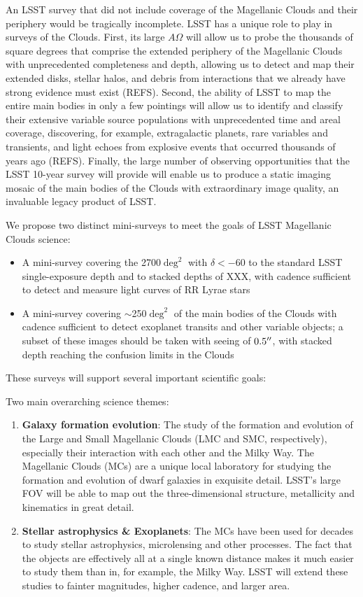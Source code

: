 An LSST survey that did not include coverage of the Magellanic Clouds and their periphery would be tragically incomplete.  LSST has a unique role to play in surveys of the Clouds.  First, its large $A\Omega$ will allow us to probe the thousands of square degrees that comprise the extended periphery of the Magellanic Clouds with unprecedented completeness and depth, allowing us to detect and map their extended disks, stellar halos, and debris from interactions that we already have strong evidence must exist (REFS).  Second, the ability of LSST to map the entire main bodies in only a few pointings will allow us to identify and classify their extensive variable source populations with unprecedented time and areal coverage, discovering, for example, extragalactic planets, rare variables and transients, and light echoes from explosive events that occurred thousands of years ago (REFS).  Finally, the large number of observing opportunities that the LSST 10-year survey will provide will enable us to produce a static imaging mosaic of the main bodies of the Clouds with extraordinary image quality, an invaluable legacy product of LSST.

We propose two distinct mini-surveys to meet the goals of LSST Magellanic Clouds science:
\begin{itemize}
\item A mini-survey covering the 2700$\deg^2$ with $\delta < -60$ to the standard LSST single-exposure depth and to stacked depths of XXX, with cadence sufficient to detect and measure light curves of RR Lyrae stars 
\item A mini-survey covering $\sim$250$\deg^2$ of the main bodies of the Clouds with cadence sufficient to detect exoplanet transits and other variable objects; a subset of these images should be taken with seeing of $0.5''$, with stacked depth reaching the confusion limits in the Clouds
\end{itemize}

These surveys will support several important scientific goals:


Two main overarching science themes:
\begin{enumerate}
\item {\bf Galaxy formation evolution}: The study of the formation and evolution of the Large and Small
  Magellanic Clouds (LMC and SMC, respectively), especially their interaction with each other and the Milky Way.
  The Magellanic Clouds (MCs) are a unique local laboratory for studying the formation and evolution of
  dwarf galaxies in exquisite detail.  LSST's large FOV will be able to map out the three-dimensional
  structure, metallicity and kinematics in great detail.
\item {\bf Stellar astrophysics \& Exoplanets}:  The MCs have been used for decades to study stellar
  astrophysics, microlensing and other processes.  The fact that the objects are effectively all at a single
  known distance makes it much easier to study them than in, for example, the Milky Way.  LSST will extend
  these studies to fainter magnitudes, higher cadence, and larger area.
\end{enumerate}

